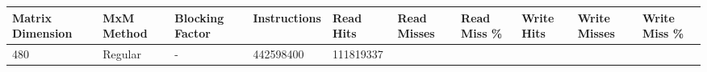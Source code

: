 \documentclass[11pt]{article}
\begin{document}
\begin{longtable}[]{@{}llllllllll@{}}
\toprule
\begin{minipage}[b]{0.09\columnwidth}\raggedright\strut
Matrix Dimension\strut
\end{minipage} & \begin{minipage}[b]{0.06\columnwidth}\raggedright\strut
MxM Method\strut
\end{minipage} & \begin{minipage}[b]{0.09\columnwidth}\raggedright\strut
Blocking Factor\strut
\end{minipage} & \begin{minipage}[b]{0.07\columnwidth}\raggedright\strut
Instructions\strut
\end{minipage} & \begin{minipage}[b]{0.06\columnwidth}\raggedright\strut
Read Hits\strut
\end{minipage} & \begin{minipage}[b]{0.07\columnwidth}\raggedright\strut
Read Misses\strut
\end{minipage} & \begin{minipage}[b]{0.07\columnwidth}\raggedright\strut
Read Miss \%\strut
\end{minipage} & \begin{minipage}[b]{0.06\columnwidth}\raggedright\strut
Write Hits\strut
\end{minipage} & \begin{minipage}[b]{0.07\columnwidth}\raggedright\strut
Write Misses\strut
\end{minipage} & \begin{minipage}[b]{0.07\columnwidth}\raggedright\strut
Write Miss \%\strut
\end{minipage}\tabularnewline
\midrule
\endhead
\begin{minipage}[t]{0.09\columnwidth}\raggedright\strut
480\strut
\end{minipage} & \begin{minipage}[t]{0.06\columnwidth}\raggedright\strut
Regular\strut
\end{minipage} & \begin{minipage}[t]{0.09\columnwidth}\raggedright\strut
-\strut
\end{minipage} & \begin{minipage}[t]{0.07\columnwidth}\raggedright\strut
442598400\strut
\end{minipage} & \begin{minipage}[t]{0.06\columnwidth}\raggedright\strut
111819337\strut

\end{minipage}
\end{longtable}
\end{document}
